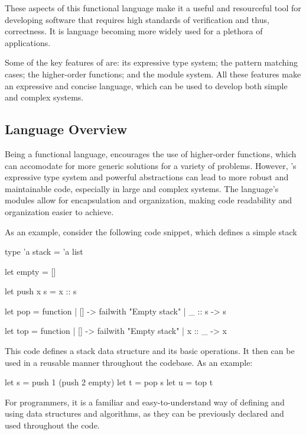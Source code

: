 These aspects of this functional language make it a useful and resourceful tool 
for developing software that requires high standards of verification and thus, correctness.
It is language becoming more widely used for a plethora of applications.

Some of the key features of \ocaml are: its expressive type system; the pattern matching cases; 
the higher-order functions; and the module system. All these features make \ocaml an expressive 
and concise language, which can be used to develop both simple and complex systems.

\subsection{Language Overview} %
\label{sub:language_overview}

Being a functional language, \ocaml encourages the use of higher-order functions, 
which can accomodate for more generic solutions for a variety of problems. However,
\ocaml's expressive type system and powerful abstractions can lead to more robust
and maintainable code, especially in large and complex systems. The language's 
modules allow for encapsulation and organization, making code readability and organization 
easier to achieve.

As an example, consider the following code snippet, which defines a simple stack

\begin{ocamlenv}
    type 'a stack = 'a list

    let empty = []

    let push x s = x :: s

    let pop = function
        | [] -> failwith "Empty stack"
        | _ :: s -> s

    let top = function
        | [] -> failwith "Empty stack"
        | x :: _ -> x
\end{ocamlenv}

This code defines a stack data structure and its basic operations. It then can be used 
in a reusable manner throughout the codebase. As an example:

\begin{ocamlenv}
    let s = push 1 (push 2 empty)
    let t = pop s
    let u = top t
\end{ocamlenv}


For programmers, it is a familiar and easy-to-understand way of defining and using 
data structures and algorithms, as they can be previously declared and used throughout 
the code.

